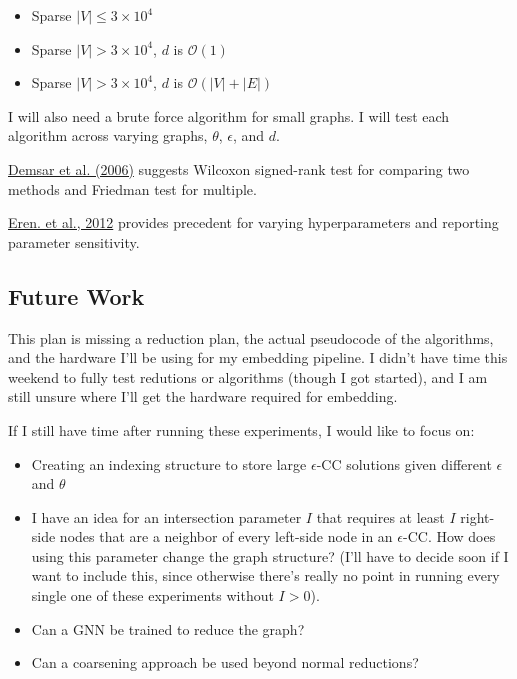 \documentclass{article}
\begin{document}
\begin{itemize}
    \item Sparse $|V| \le 3 \times 10^4$
    \item Sparse $|V| > 3 \times 10^4$, $d$ is $\mathcal{O}(1)$
    \item Sparse $|V| > 3 \times 10^4$, $d$ is $\mathcal{O}(|V| + |E|)$
\end{itemize}

I will also need a brute force algorithm for small graphs. I will test each algorithm across varying graphs, $\theta$, $\epsilon$, and $d$.

\href{https://www.jmlr.org/papers/volume7/demsar06a/demsar06a.pdf}{Demsar et al. (2006)} suggests Wilcoxon signed-rank test for comparing two methods and Friedman test for multiple.

\href{https://pubmed.ncbi.nlm.nih.gov/22772837/}{Eren. et al., 2012} provides precedent for varying hyperparameters and reporting parameter sensitivity.

\subsection{Future Work}

This plan is missing a reduction plan, the actual pseudocode of the algorithms, and the hardware I'll be using for my embedding pipeline. I didn't have time this weekend to fully test redutions or algorithms (though I got started), and I am still unsure where I'll get the hardware required for embedding.

If I still have time after running these experiments, I would like to focus on:

\begin{itemize}
    \item Creating an indexing structure to store large $\epsilon$-CC solutions given different $\epsilon$ and $\theta$
    \item I have an idea for an intersection parameter $I$ that requires at least $I$ right-side nodes that are a neighbor of every left-side node in an $\epsilon$-CC. How does using this parameter change the graph structure? (I'll have to decide soon if I want to include this, since otherwise there's really no point in running every single one of these experiments without $I > 0$).
    \item Can a GNN be trained to reduce the graph?
    \item Can a coarsening approach be used beyond normal reductions?
\end{itemize}
\end{document}

